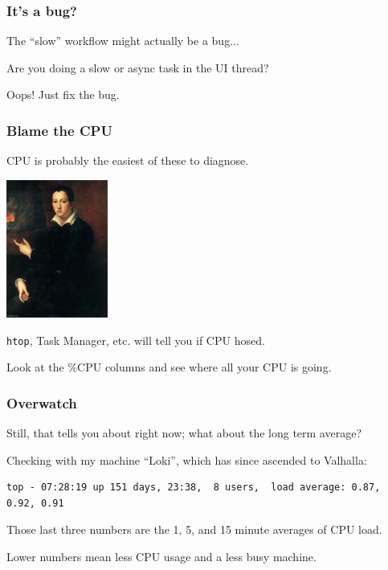 \begin{frame}
\frametitle{It's a bug?}

The ``slow'' workflow might actually be a bug...

Are you doing a slow or async task in the UI thread?

Oops! Just fix the bug.

\end{frame}



\begin{frame}
\frametitle{Blame the CPU}



CPU is probably the easiest of these to diagnose.

\begin{center}
  \includegraphics[width=0.25\textwidth]{images/onfireyo.jpg}
\end{center}

\texttt{htop}, Task Manager, etc. will tell you if CPU hosed.


Look at the \%CPU columns and see where all your CPU is going. 



\end{frame}



\begin{frame}[fragile]
\frametitle{Overwatch}



Still, that tells you about right now;  what about the long term average?

Checking with my machine ``Loki'', which has since ascended to Valhalla:\\[1em]

{\scriptsize
\begin{verbatim}
top - 07:28:19 up 151 days, 23:38,  8 users,  load average: 0.87, 0.92, 0.91
\end{verbatim}
}

Those last three numbers are the 1, 5, and 15 minute averages of CPU load.

Lower numbers mean less CPU usage and a less busy machine. 


\end{frame}




